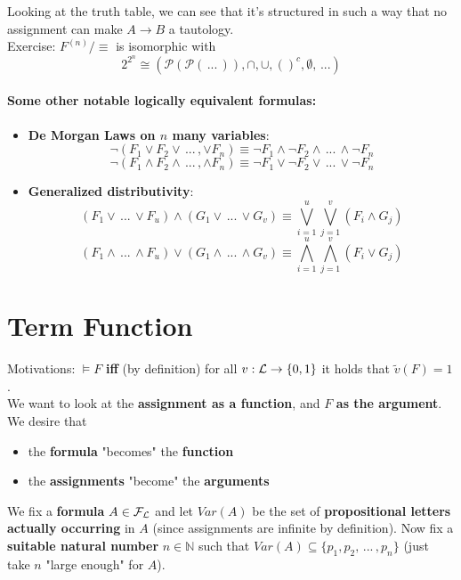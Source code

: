 	Looking at the truth table, we can see that it's structured in such a way that no assignment can make $A \rightarrow B$ a tautology.\\

	Exercise: $F^{(n)}/\equiv$ is isomorphic with
	$$2^{2^{n}} \cong (\mathcal{P} (\mathcal{P} (\, ... \, )), \cap, \cup, ()^c, \emptyset, \, ...) $$

	\nn \nn

	\paragraph{Some other notable logically equivalent formulas:}
	\begin{itemize}
		\item \textbf{De Morgan Laws on $n$ many variables}:
		$$ \neg (F_1 \vee F_2 \vee \, ... \, , \vee F_n) \equiv \neg F_1 \wedge \neg F_2 \wedge \, ... \, \wedge \neg F_n $$
		$$ \neg (F_1 \wedge F_2 \wedge \, ... \, , \wedge F_n) \equiv \neg F_1 \vee \neg F_2 \vee \, ... \, \vee \neg F_n $$
		\item \textbf{Generalized distributivity}:
		$$ (F_1 \vee \, ... \, \vee F_u) \wedge (G_1 \vee \, ... \, \vee G_v) \equiv \bigvee_{i=1}^u \bigvee_{j = 1}^v (F_i \wedge G_j) $$
		$$ (F_1 \wedge \, ... \, \wedge F_u) \vee (G_1 \wedge \, ... \, \wedge G_v) \equiv \bigwedge_{i=1}^u \bigwedge_{j = 1}^v (F_i \vee G_j) $$
	\end{itemize}

	\newpage

	\section{Term Function}
	Motivations: $\models F$ \textbf{iff} (by definition) for all $v: \mathcal{L} \rightarrow \{0,1\}$ it holds that $\tilde{v}(F) = 1$.\\

	We want to look at the \textbf{assignment as a function}, and $F$ \textbf{as the argument}.\\
	We desire that
	\begin{itemize}
		\item the \textbf{formula} "becomes" the \textbf{function}
		\item the \textbf{assignments} "become" the \textbf{arguments}
	\end{itemize}

	We fix a \textbf{formula} $A \in \mathcal{F}_\mathcal{L}$ and let $Var(A)$ be the set of \textbf{propositional letters actually occurring} in $A$ (since assignments are infinite by definition). Now fix a \textbf{suitable natural number} $n \in \mathbb{N}$ such that $Var(A) \subseteq \{p_1, p_2, \, ... \, , p_n\}$ (just take $n$ "large enough" for $A$).\\

